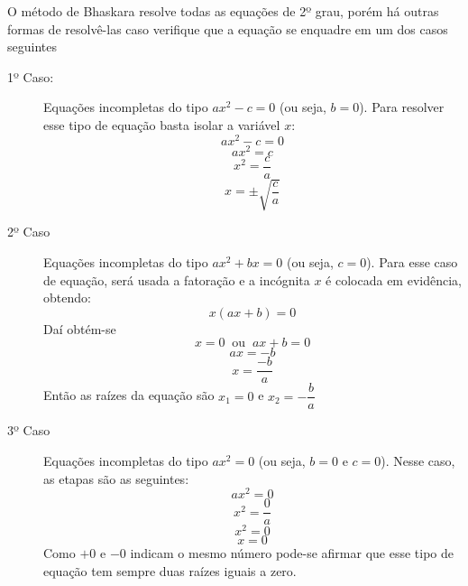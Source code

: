	O método de Bhaskara resolve todas as equações de 2º grau, porém há outras formas de resolvê-las caso verifique que a equação se enquadre em um dos casos seguintes
	\begin{description}
		\item[1º Caso:] Equações incompletas do tipo $ax^2 - c =0$ (ou seja, $b = 0$). Para resolver esse tipo de equação basta isolar a variável $x$:
		\[
		ax^2 - c =0
		\]
		\[
		ax^2 = c
		\]
		\[
		x^2 = \dfrac{c}{a}
		\]
		\[
		x = \pm \sqrt{\frac{c}{a}}
		\]
  
        \begin{texample}
        \centering
        \tcbhighmath{
            \begin{minipage}{2.5cm}
                \vspace{-0.5cm}
                \[
		      x^2 - 9 =0
		      \]
		      \[
		      x^2 = 9
		      \]
		      \[
		      x = \pm \sqrt{9}
		      \]
		      \[
		      x = \pm 3
		      \]
            \end{minipage}
        }
        \end{texample}
		
		\item[2º Caso] Equações incompletas do tipo $ax^2 + bx = 0$ (ou seja, $c=0$). Para esse caso de equação, será usada a fatoração e a incógnita $x$ é colocada em evidência, obtendo: 
		\[
		x(ax+b)=0
		\]
		Daí obtém-se
		\[
		x=0 \;\;\text{ou} \;\;ax + b=0
		\]
		\[
		ax=-b
		\]
		\[
		x=\dfrac{-b}{a}
		\]
		Então as raízes da equação são $x_1 = 0$ e $x_2 = - \dfrac{b}{a}$\\

        \begin{texample}
        \centering
        \end{texample}
		
		\item[3º Caso] Equações incompletas do tipo $ax^2 = 0$ (ou seja, $b=0$ e $c=0$). Nesse caso, as etapas são as seguintes:
		\[
		ax^2 = 0
		\]
		\[
		x^2 = \dfrac{0}{a}
		\]
		\[
		x^2 = 0
		\]
		\[
		x = 0
		\]
		Como $+0$ e $-0$ indicam o mesmo número pode-se afirmar que esse tipo de equação tem sempre duas raízes iguais a zero.
		

\end{description}
